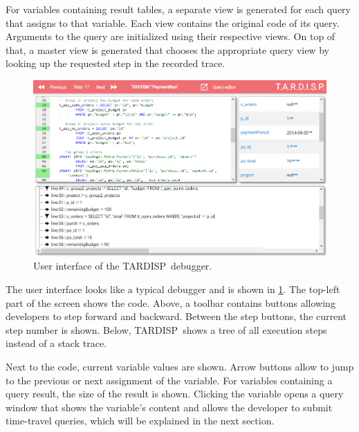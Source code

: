 \documentclass[english,conference,final]{IEEEtran}
\newcommand{\todo}[2][]{\pdfmargincomment[author={#1}]{#2}}
\newcommand{\tool}{TAR\-DISP}
\begin{document}
For variables containing result tables, a separate view is generated for each query that assigns to that variable.
Each view contains the original code of its query.
Arguments to the query are initialized using their respective views.
On top of that, a master view is generated that chooses the appropriate query view by looking up the requested step in the recorded trace.

\begin{figure}
	\centering
		\includegraphics[width=\linewidth]{odb.png}
	\caption{User interface of the \tool\ debugger.}
	\label{fig:odb}
\end{figure}

The user interface looks like a typical debugger and is shown in \cref{fig:odb}.
The top-left part of the screen shows the code.
Above, a toolbar contains buttons allowing developers to step forward and backward.
Between the step buttons, the current step number is shown.
Below, \tool\ shows a tree of all execution steps instead of a stack trace.

Next to the code, current variable values are shown.
Arrow buttons allow to jump to the previous or next assignment of the variable.
For variables containing a query result, the size of the result is shown.
Clicking the variable opens a query window that shows the variable's content and allows the developer to submit time-travel queries, which will be explained in the next section.

\end{document}
